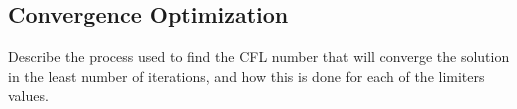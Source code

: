 
\subsection*{Convergence Optimization}
Describe the process used to find the CFL number that will converge the solution in the least number of iterations, and how this is done for each of the limiters values.